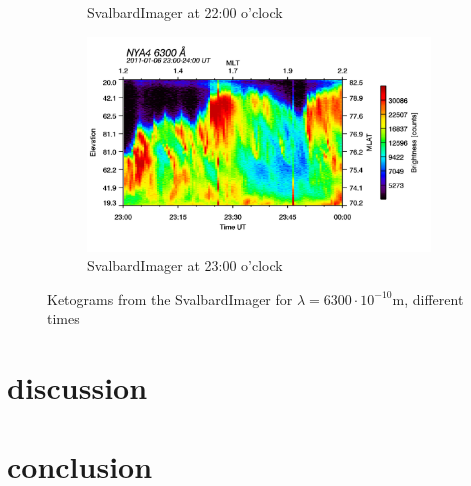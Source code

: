 \documentclass[10pt,a4paper]{article}
\begin{document}
\begin{figure}[h]
\begin{subfigure}{0.3\textwidth}
	\caption{ SvalbardImager at 22:00 o'clock \label{SBI_6_22}}
\end{subfigure}
\begin{subfigure}{0.3\textwidth}
\centering
	\includegraphics[width=\textwidth]{SvalbardImager6300A23.png}
	\caption{ SvalbardImager at 23:00 o'clock \label{SBI_6_23}}
\end{subfigure}
\caption{Ketograms from the SvalbardImager for $\lambda=6300 \cdot 10^{-10} \mathrm{m}$, different times }
\end{figure}


\clearpage
\section{discussion}

\section{conclusion}


 
\end{document}
